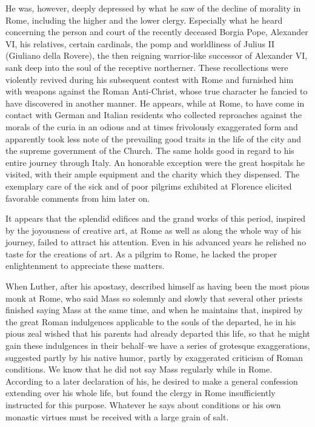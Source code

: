He was, however, deeply depressed by what he saw of the decline
of morality in Rome, including the higher and the lower clergy.
Especially what he heard concerning the person and court of the
recently deceased Borgia Pope, Alexander VI, his relatives, certain
cardinals, the pomp and worldliness of Julius II (Giuliano della
Rovere), the then reigning warrior-like successor of Alexander VI,
sank deep into the soul of the receptive northerner. These recollections
were violently revived during his subsequent contest with
Rome and furnished him with weapons against the Roman Anti-Christ,
whose true character he fancied to have discovered in another
manner. He appears, while at Rome, to have come in contact with
German and Italian residents who collected reproaches against the
morals of the curia in an odious and at times frivolously exaggerated
form and apparently took less note of the prevailing good traits
in the life of the city and the supreme government of the Church.
The same holds good in regard to his entire journey through Italy.
An honorable exception were the great hospitals he visited, with
their ample equipment and the charity which they dispensed. The
exemplary care of the sick and of poor pilgrims exhibited at Florence
elicited favorable comments from him later on.

It appears that the splendid edifices and the grand works of this
period, inspired by the joyousness of creative art, at Rome as well as
along the whole way of his journey, failed to attract his attention.
Even in his advanced years he relished no taste for the creations of art.
As a pilgrim to Rome, he lacked the proper enlightenment to appreciate
these matters.

When Luther, after his apostasy, described himself as having been
the most pious monk at Rome, who said Mass so solemnly and slowly
that several other priests finished saying Mass at the same time, and
when he maintains that, inspired by the great Roman indulgences
applicable to the souls of the departed, he in his pious zeal wished
that his parents had already departed this life, so that he might gain
these indulgences in their behalf--we have a series of grotesque exaggerations,
suggested partly by his native humor, partly by exaggerated
criticism of Roman conditions. We know that he did not say
Mass regularly while in Rome. According to a later declaration
of his, he desired to make a general confession extending over
his whole life, but found the clergy in Rome insufficiently instructed
for this purpose. Whatever he says about conditions or his own
monastic virtues must be received with a large grain of salt.

